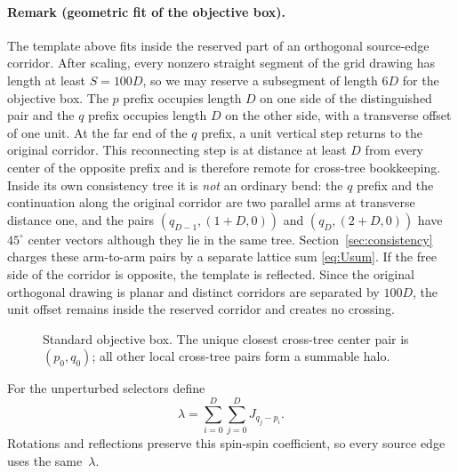 \documentclass[12pt,a4paper]{article}
\begin{document}
\paragraph{Remark (geometric fit of the objective box).}
The template above fits inside the reserved part of an orthogonal source-edge corridor.  After scaling, every nonzero straight segment of the grid drawing has length at least $S=100D$, so we may reserve a subsegment of length $6D$ for the objective box.  The $p$ prefix occupies length $D$ on one side of the distinguished pair and the $q$ prefix occupies length $D$ on the other side, with a transverse offset of one unit.  At the far end of the $q$ prefix, a unit vertical step returns to the original corridor.  This reconnecting step is at distance at least $D$ from every center of the opposite prefix and is therefore remote for cross-tree bookkeeping.  Inside its own consistency tree it is \emph{not} an ordinary bend: the $q$ prefix and the continuation along the original corridor are two parallel arms at transverse distance one, and the pairs $(q_{D-1},(1+D,0))$ and $(q_D,(2+D,0))$ have $45^\circ$ center vectors although they lie in the same tree.  Section~\ref{sec:consistency} charges these arm-to-arm pairs by a separate lattice sum \eqref{eq:Usum}.  If the free side of the corridor is opposite, the template is reflected.  Since the original orthogonal drawing is planar and distinct corridors are separated by $100D$, the unit offset remains inside the reserved corridor and creates no crossing.

\begin{figure}[ht]
\centering
{}
\caption{Standard objective box.  The unique closest cross-tree center pair is $(p_0,q_0)$; all other local cross-tree pairs form a summable halo.}
\label{fig:objective}
\end{figure}

For the unperturbed selectors define
\begin{equation}\label{eq:lambda-def}
 \lambda=\sum_{i=0}^{D}\sum_{j=0}^{D}J_{q_j-p_i}.
\end{equation}
Rotations and reflections preserve this spin-spin coefficient, so every source edge uses the same~$\lambda$.
\end{document}
